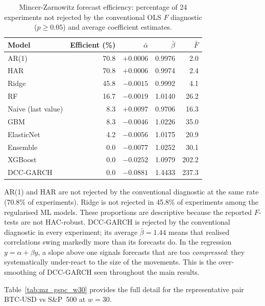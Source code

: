 \begin{table}[H]
    \centering
    \caption{Mincer-Zarnowitz forecast efficiency: percentage of 24 experiments
             not rejected by the conventional OLS $F$ diagnostic ($p \geq 0.05$) and average coefficient estimates.}
    \label{tab:mz_summary}
    \begin{tabular}{lrrrr}
        \toprule
        Model & Efficient (\%) & $\bar{\alpha}$ & $\bar{\beta}$ & $\bar{F}$ \\
        \midrule
        AR(1)         & 70.8 & $+0.0006$ & 0.9976 &   2.0 \\
        HAR         & 70.8 & $+0.0006$ & 0.9974 &   2.4 \\
        Ridge       & 45.8 & $-0.0015$ & 0.9992 &   4.1 \\
        RF          & 16.7 & $-0.0019$ & 1.0140 &  26.2 \\
        Naive (last value) &  8.3 & $+0.0097$ & 0.9706 &  16.3 \\
        GBM         &  8.3 & $-0.0046$ & 1.0226 &  35.0 \\
        ElasticNet  &  4.2 & $-0.0056$ & 1.0175 &  20.9 \\
        Ensemble    &  0.0 & $-0.0077$ & 1.0252 &  30.1 \\
        XGBoost    &  0.0 & $-0.0252$ & 1.0979 & 202.2 \\
        DCC-GARCH  &  0.0 & $-0.0881$ & 1.4433 & 237.3 \\
        \bottomrule
    \end{tabular}
\end{table}

AR(1) and HAR are not rejected by the conventional diagnostic at the same rate
(70.8\% of experiments). Ridge is not rejected in 45.8\% of experiments among
the regularised ML models. These proportions are descriptive because the reported
$F$-tests are not HAC-robust. DCC-GARCH is rejected by the conventional diagnostic
in every experiment; its average $\bar{\beta} = 1.44$ means that realised
correlations swing markedly more than its forecasts do. In the regression
$y = \alpha + \beta\hat{y}$, a slope above one signals forecasts that are too
\emph{compressed}: they systematically under-react to the size of the
movements. This is the over-smoothing of DCC-GARCH seen throughout the main
results.

Table~\ref{tab:mz_gspc_w30} provides the full detail for the representative
pair BTC-USD vs S\&P~500 at $w = 30$.

